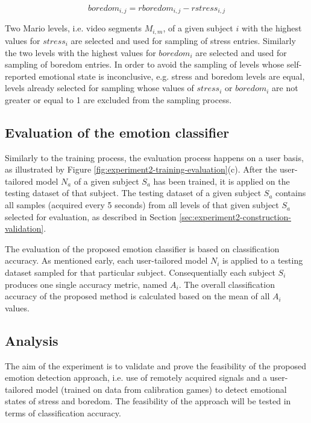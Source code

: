 \begin{equation}
  boredom_{i,j} = rboredom_{i,j} - rstress_{i,j}
  \label{eq:boredom-score}
\end{equation}

Two Mario levels, i.e. video segments $M_{i,m}$, of a given subject $i$ with the highest values for $stress_i$ are selected and used for sampling of stress entries. Similarly the two levels with the highest values for $boredom_i$ are selected and used for sampling of boredom entries. In order to avoid the sampling of levels whose self-reported emotional state is inconclusive, e.g. stress and boredom levels are equal, levels already selected for sampling whose values of $stress_i$ or $boredom_i$ are not greater or equal to 1 are excluded from the sampling process.

\subsection{Evaluation of the emotion classifier}

Similarly to the training process, the evaluation process happens on a user basis, as illustrated by Figure \ref{fig:experiment2-training-evaluation}(c). After the user-tailored model $N_a$ of a given subject $S_a$ has been trained, it is applied on the testing dataset of that subject. The testing dataset of a given subject $S_a$ contains all samples (acquired every 5 seconds) from all levels of that given subject $S_a$ selected for evaluation, as described in Section \ref{sec:experiment2-construction-validation}.

The evaluation of the proposed emotion classifier is based on classification accuracy. As mentioned early, each user-tailored model $N_i$ is applied to a testing dataset sampled for that particular subject. Consequentially each subject $S_i$ produces one single accuracy metric, named $A_i$. The overall classification accuracy of the proposed method is calculated based on the mean of all $A_i$ values.

\subsection{Analysis}

The aim of the experiment is to validate and prove the feasibility of the proposed emotion detection approach, i.e. use of remotely acquired signals and a user-tailored model (trained on data from calibration games) to detect emotional states of stress and boredom. The feasibility of the approach will be tested in terms of classification accuracy.

